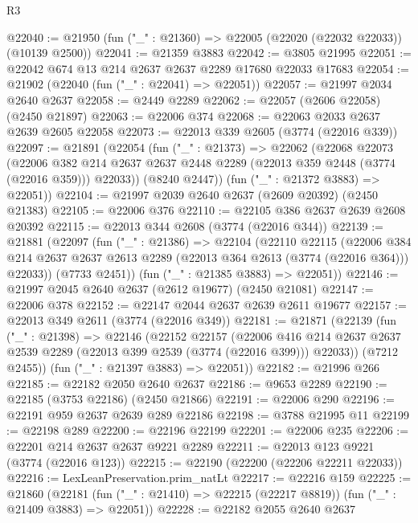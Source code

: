 \begin{lexlean}{R3}
\begin{coremodule}
@22040 := @21950 (fun ("_" : @21360) => @22005 (@22020 (@22032 @22033)) (@10139 @2500))
@22041 := @21359 @3883
@22042 := @3805 @21995
@22051 := @22042 @674 @13 @214 @2637 @2637 @2289 @17680 @22033 @17683
@22054 := @21902 (@22040 (fun ("_" : @22041) => @22051))
@22057 := @21997 @2034 @2640 @2637
@22058 := @2449 @2289
@22062 := @22057 (@2606 @22058) (@2450 @21897)
@22063 := @22006 @374
@22068 := @22063 @2033 @2637 @2639 @2605 @22058
@22073 := @22013 @339 @2605 (@3774 (@22016 @339))
@22097 := @21891
    (@22054
      (fun ("_" : @21373) =>
      @22062
        (@22068
          @22073
          (@22006
            @382
            @214
            @2637
            @2637
            @2448
            @2289
            (@22013 @359 @2448 (@3774 (@22016 @359)))
            @22033))
        (@8240 @2447))
      (fun ("_" : @21372 @3883) => @22051))
@22104 := @21997 @2039 @2640 @2637 (@2609 @20392) (@2450 @21383)
@22105 := @22006 @376
@22110 := @22105 @386 @2637 @2639 @2608 @20392
@22115 := @22013 @344 @2608 (@3774 (@22016 @344))
@22139 := @21881
    (@22097
      (fun ("_" : @21386) =>
      @22104
        (@22110
          @22115
          (@22006
            @384
            @214
            @2637
            @2637
            @2613
            @2289
            (@22013 @364 @2613 (@3774 (@22016 @364)))
            @22033))
        (@7733 @2451))
      (fun ("_" : @21385 @3883) => @22051))
@22146 := @21997 @2045 @2640 @2637 (@2612 @19677) (@2450 @21081)
@22147 := @22006 @378
@22152 := @22147 @2044 @2637 @2639 @2611 @19677
@22157 := @22013 @349 @2611 (@3774 (@22016 @349))
@22181 := @21871
    (@22139
      (fun ("_" : @21398) =>
      @22146
        (@22152
          @22157
          (@22006
            @416
            @214
            @2637
            @2637
            @2539
            @2289
            (@22013 @399 @2539 (@3774 (@22016 @399)))
            @22033))
        (@7212 @2455))
      (fun ("_" : @21397 @3883) => @22051))
@22182 := @21996 @266
@22185 := @22182 @2050 @2640 @2637
@22186 := @9653 @2289
@22190 := @22185 (@3753 @22186) (@2450 @21866)
@22191 := @22006 @290
@22196 := @22191 @959 @2637 @2639 @289 @22186
@22198 := @3788 @21995 @11
@22199 := @22198 @289
@22200 := @22196 @22199
@22201 := @22006 @235
@22206 := @22201 @214 @2637 @2637 @9221 @2289
@22211 := @22013 @123 @9221 (@3774 (@22016 @123))
@22215 := @22190 (@22200 (@22206 @22211 @22033))
@22216 := LexLeanPreservation.prim_natLt
@22217 := @22216 @159
@22225 := @21860
    (@22181 (fun ("_" : @21410) => @22215 (@22217 @8819)) (fun ("_" : @21409 @3883) => @22051))
@22228 := @22182 @2055 @2640 @2637

\end{coremodule}
\end{lexlean}

